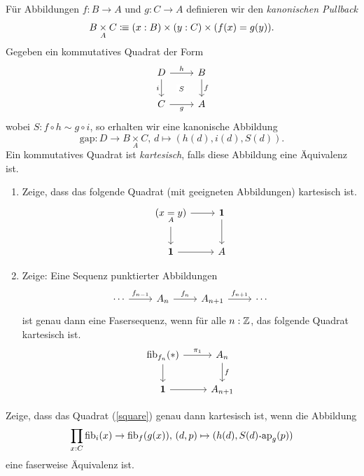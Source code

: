\documentclass{hott-übung}
\begin{document}
\setcounter{blattnummer}{10}
\setcounter{aufgabennummer}{0}

\blatt

Für Abbildungen \(f : B \to A\) und \(g : C \to A\) definieren wir den \emph{kanonischen Pullback}
\[B \underset{A}{\times} C \vcentcolon\mspace{-1.2mu}\equiv (x : B) \times (y : C) \times (f(x) = g(y)).\]
Gegeben ein kommutatives Quadrat der Form
\begin{equation}
  \label{square}
  \begin{tikzcd}
  	D & B \\
  	C & A
  	\arrow["h", from=1-1, to=1-2]
  	\arrow["i"', from=1-1, to=2-1]
  	\arrow["S"{description}, draw=none, from=1-1, to=2-2]
  	\arrow["f", from=1-2, to=2-2]
  	\arrow["g"', from=2-1, to=2-2]
  \end{tikzcd}
\end{equation}
wobei \(S : f\circ h \sim g\circ i\), so erhalten wir eine kanonische Abbildung
\[\mathrm{gap} : D \longrightarrow B \underset{A}{\times} C, \, d \mapsto (h(d),i(d),S(d)).\]
Ein kommutatives Quadrat ist \emph{kartesisch}, falls diese Abbildung eine Äquivalenz ist.

\aufgabe{}
\begin{enumerate}
  \item
  Zeige, dass das folgende Quadrat (mit geeigneten Abbildungen) kartesisch ist.
  \[\begin{tikzcd}
    {(x \underset{A}{=} y)} & \eins \\
    \eins & A
    \arrow[from=1-1,to=1-2]
    \arrow[from=1-1,to=2-1]
    \arrow[from=1-2,to=2-2]
    \arrow[from=2-1,to=2-2]
  \end{tikzcd}
  \]
  \item
  Zeige: Eine Sequenz punktierter Abbildungen
  \[\begin{tikzcd}
    {\cdots} & {A_n} & {A_{n+1}} & {\cdots}
    \arrow[from=1-1,to=1-2,"f_{n-1}"]
    \arrow[from=1-2,to=1-3,"f_{n}"]
    \arrow[from=1-3,to=1-4,"f_{n+1}"]
  \end{tikzcd}\]
  ist genau dann eine Fasersequenz, wenn für alle \(n : \mathbb{Z}\), das folgende Quadrat kartesisch ist.
  \[\begin{tikzcd}
    {\fib_{f_n}(\ast)} & A_n \\
    \eins & A_{n+1}
    \arrow[from=1-1,to=1-2,"\pi_1"]
    \arrow[from=1-1,to=2-1]
    \arrow[from=1-2,to=2-2,"f"]
    \arrow[from=2-1,to=2-2]
  \end{tikzcd}\]
\end{enumerate}

\aufgabe{}
Zeige, dass das Quadrat (\ref{square}) genau dann kartesisch ist, wenn die Abbildung
\[\prod_{x : C} \fib_i(x) \to \fib_f(g(x)), \, (d,p) \mapsto (h(d),S(d)\kon\ap_g(p))\]
eine faserweise Äquivalenz ist.
\end{document}
